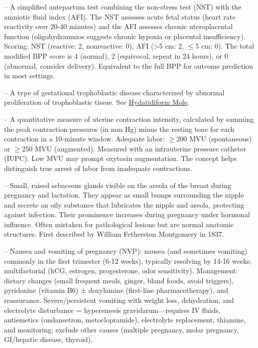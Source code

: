 -- A simplified antepartum test combining the non-stress test (NST) with the amniotic fluid index (AFI). The NST assesses acute fetal status (heart rate reactivity over 20-40 minutes) and the AFI assesses chronic uteroplacental function (oligohydramnios suggests chronic hypoxia or placental insufficiency). Scoring: NST (reactive: 2, nonreactive: 0), AFI (>5 cm: 2, \(\le\)5 cm: 0). The total modified BPP score is 4 (normal), 2 (equivocal, repeat in 24 hours), or 0 (abnormal, consider delivery). Equivalent to the full BPP for outcome prediction in most settings.

-- A type of gestational trophoblastic disease characterized by abnormal proliferation of trophoblastic tissue. See \hyperlink{Hydatidiform Mole}{Hydatidiform Mole}.

-- A quantitative measure of uterine contraction intensity, calculated by summing the peak contraction pressures (in mm Hg) minus the resting tone for each contraction in a 10-minute window. Adequate labor: \(\ge\)200 MVU (spontaneous) or \(\ge\)250 MVU (augmented). Measured with an intrauterine pressure catheter (IUPC). Low MVU may prompt oxytocin augmentation. The concept helps distinguish true arrest of labor from inadequate contractions.

-- Small, raised sebaceous glands visible on the areola of the breast during pregnancy and lactation. They appear as small bumps surrounding the nipple and secrete an oily substance that lubricates the nipple and areola, protecting against infection. Their prominence increases during pregnancy under hormonal influence. Often mistaken for pathological lesions but are normal anatomic structures. First described by William Fetherston Montgomery in 1837.

-- Nausea and vomiting of pregnancy (NVP): nausea (and sometimes vomiting) commonly in the first trimester (6-12 weeks), typically resolving by 14-16 weeks; multifactorial (hCG, estrogen, progesterone, odor sensitivity). Management: dietary changes (small frequent meals, ginger, bland foods, avoid triggers), pyridoxine (vitamin B6) ± doxylamine (first-line pharmacotherapy), and reassurance. Severe/persistent vomiting with weight loss, dehydration, and electrolyte disturbance = hyperemesis gravidarum—requires IV fluids, antiemetics (ondansetron, metoclopramide), electrolyte replacement, thiamine, and monitoring; exclude other causes (multiple pregnancy, molar pregnancy, GI/hepatic disease, thyroid).

